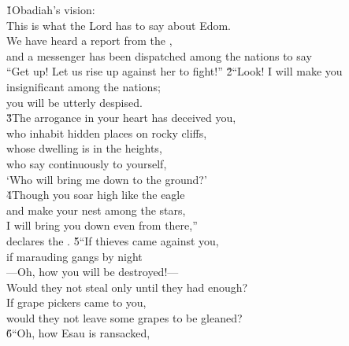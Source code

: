 


\begin{poetry}
\poeml \v{1}Obadiah's vision: \\
\poeml This is what the Lord  has to say about Edom. \\
\poeml We have heard a report from the , \\
\poemll    and a messenger has been dispatched among the nations to say \\
\poeml ``Get up! Let us rise up against her to fight!''
\poeml \v{2}``Look! I will make you insignificant among the nations; \\
\poemll    you will be utterly despised. \\
\poeml \v{3}The arrogance in your heart has deceived you, \\
\poemll    who inhabit hidden places on rocky cliffs, \\
\poemll    whose dwelling is in the heights, \\
\poemll    who say continuously to yourself, \\
\poemlll       `Who will bring me down to the ground?' \\
\poeml \v{4}Though you soar high like the eagle \\
\poemll    and make your nest among the stars, \\
\poeml I will bring you down even from there,'' \\
\poemlll       declares the .
\poeml \v{5}``If thieves came against you, \\
\poemll    if marauding gangs by night \\
\poemlll       ---Oh, how you will be destroyed!--- \\
\poeml Would they not steal only until they had enough? \\
\poeml If grape pickers came to you, \\
\poemll    would they not leave some grapes to be gleaned? \\
\poeml \v{6}``Oh, how Esau is ransacked, \\

\end{poetry}
